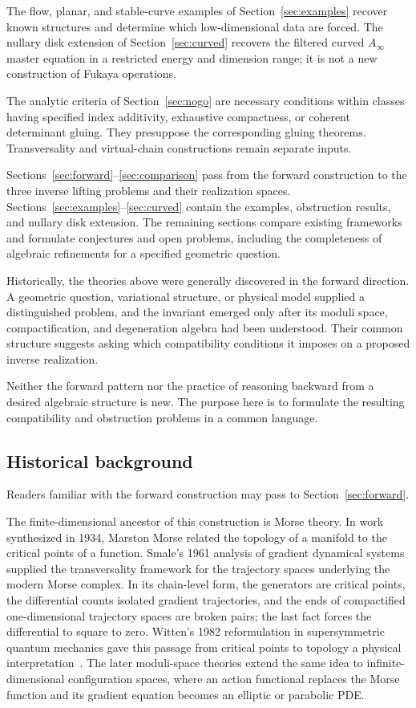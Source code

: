 \documentclass[11pt,letterpaper,twoside]{article}
\theoremstyle{plain}
\theoremstyle{definition}
\theoremstyle{remark}
\let\cite\citep
\newcommand{\Ainf}{A_\infty}
\begin{document}
The flow, planar, and stable-curve examples of Section~\ref{sec:examples} recover known structures and determine which low-dimensional data are forced.  The nullary disk extension of Section~\ref{sec:curved} recovers the filtered curved \(\Ainf\) master equation in a restricted energy and dimension range; it is not a new construction of Fukaya operations.

The analytic criteria of Section~\ref{sec:nogo} are necessary conditions within classes having specified index additivity, exhaustive compactness, or coherent determinant gluing.  They presuppose the corresponding gluing theorems.  Transversality and virtual-chain constructions remain separate inputs.

Sections~\ref{sec:forward}--\ref{sec:comparison} pass from the forward construction to the three inverse lifting problems and their realization spaces.  Sections~\ref{sec:examples}--\ref{sec:curved} contain the examples, obstruction results, and nullary disk extension.  The remaining sections compare existing frameworks and formulate conjectures and open problems, including the completeness of algebraic refinements for a specified geometric question.

Historically, the theories above were generally discovered in the forward direction.  A geometric question, variational structure, or physical model supplied a distinguished problem, and the invariant emerged only after its moduli space, compactification, and degeneration algebra had been understood.  Their common structure suggests asking which compatibility conditions it imposes on a proposed inverse realization.

Neither the forward pattern nor the practice of reasoning backward from a desired algebraic structure is new.  The purpose here is to formulate the resulting compatibility and obstruction problems in a common language.

\subsection{Historical background}\label{sec:history}

Readers familiar with the forward construction may pass to Section~\ref{sec:forward}.

The finite-dimensional ancestor of this construction is Morse theory.  In work synthesized in 1934, Marston Morse related the topology of a manifold to the critical points of a function.  Smale's 1961 analysis of gradient dynamical systems supplied the transversality framework for the trajectory spaces underlying the modern Morse complex.  In its chain-level form, the generators are critical points, the differential counts isolated gradient trajectories, and the ends of compactified one-dimensional trajectory spaces are broken pairs; the last fact forces the differential to square to zero.  Witten's 1982 reformulation in supersymmetric quantum mechanics gave this passage from critical points to topology a physical interpretation~\cite{morse1934,smale1961,witten1982}.  The later moduli-space theories extend the same idea to infinite-dimensional configuration spaces, where an action functional replaces the Morse function and its gradient equation becomes an elliptic or parabolic PDE.
\end{document}
